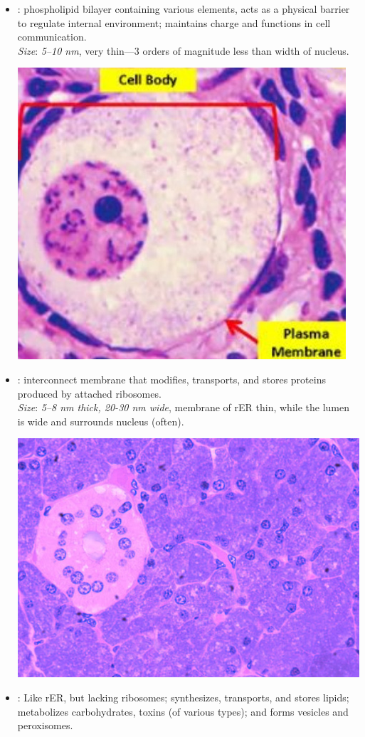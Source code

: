 \begin{multicols}{2}
\begin{itemize}
\begin{center}
  \end{center}
  \item {}: phospholipid bilayer containing various elements, acts as a physical barrier to regulate internal environment; maintains charge and functions in cell communication. \\
  \textit{Size}: \emph{5--10 \si{nm}}, very thin---3 orders of magnitude less than width of nucleus.
  \begin{center}
    \hspace{-30pt}\includegraphics[width=0.65\columnwidth]{images/week-1-plasma.jpg}
  \end{center}
  \item {}: interconnect membrane that modifies, transports, and stores proteins produced by attached ribosomes. \\
  \textit{Size}: \emph{5--8 \si{nm} thick, \emph{20-30 \si{nm} wide}}, membrane of rER thin, while the lumen is wide and surrounds nucleus (often).
  \begin{center}
    \hspace{-30pt}\includegraphics[width=0.65\columnwidth]{images/week-1-rer.jpg}
  \end{center}
  \item {}: Like rER, but lacking ribosomes; synthesizes, transports, and stores lipids; metabolizes carbohydrates, toxins (of various types); and forms vesicles and peroxisomes.\\

\end{itemize}
\end{multicols}
